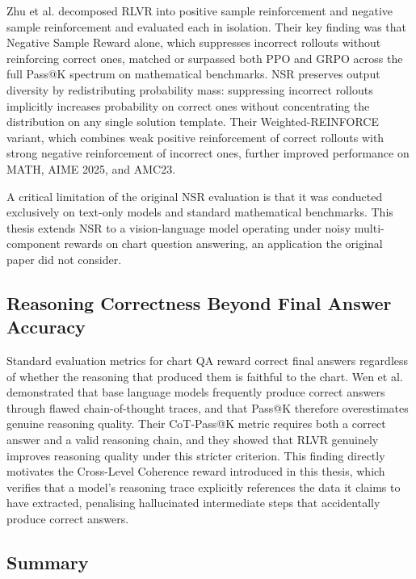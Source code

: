 \documentclass{iutbscthesis}
\begin{document}
Zhu et al. \cite{zhu2025nsr} decomposed RLVR into positive sample reinforcement
and negative sample reinforcement and evaluated each in isolation. Their key
finding was that Negative Sample Reward alone, which suppresses incorrect
rollouts without reinforcing correct ones, matched or surpassed both PPO and
GRPO across the full Pass@K spectrum on mathematical benchmarks. NSR
preserves output diversity by redistributing probability mass: suppressing
incorrect rollouts implicitly increases probability on correct ones without
concentrating the distribution on any single solution template. Their
Weighted-REINFORCE variant, which combines weak positive reinforcement of
correct rollouts with strong negative reinforcement of incorrect ones, further
improved performance on MATH, AIME 2025, and AMC23.

A critical limitation of the original NSR evaluation is that it was conducted
exclusively on text-only models and standard mathematical benchmarks. This
thesis extends NSR to a vision-language model operating under noisy
multi-component rewards on chart question answering, an application the
original paper did not consider.

\subsection{Reasoning Correctness Beyond Final Answer Accuracy}

Standard evaluation metrics for chart QA reward correct final answers regardless
of whether the reasoning that produced them is faithful to the chart. Wen et al.
\cite{wen2025cotpass} demonstrated that base language models frequently produce
correct answers through flawed chain-of-thought traces, and that Pass@K therefore
overestimates genuine reasoning quality. Their CoT-Pass@K metric requires both
a correct answer and a valid reasoning chain, and they showed that RLVR
genuinely improves reasoning quality under this stricter criterion. This finding
directly motivates the Cross-Level Coherence reward introduced in this thesis,
which verifies that a model's reasoning trace explicitly references the data it
claims to have extracted, penalising hallucinated intermediate steps that
accidentally produce correct answers.

\subsection{Summary}
\end{document}
